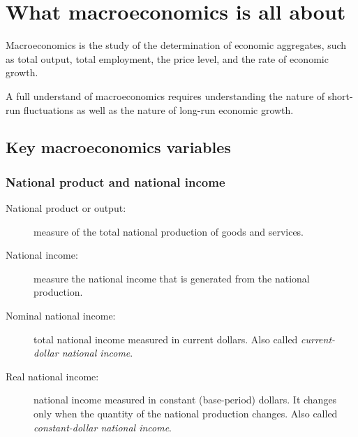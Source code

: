 \documentclass[10pt, twocolumn]{article}
\begin{document}










\section{What macroeconomics is all about}
Macroeconomics is the study of the determination of economic aggregates, such as total output, total employment, the price level, and the rate of economic growth.

A full understand of macroeconomics requires understanding the nature of short-run fluctuations as well as the nature of long-run economic growth.

\subsection{Key macroeconomics variables}
\subsubsection{National product and national income}
\begin{description}
  \item[National product or output:] measure of the total national production of goods and services.
  \item[National income:] measure the national income that is generated from the national production.
  \item[Nominal national income:] total national income measured in current dollars.
        Also called \emph{current-dollar national income}.
  \item[Real national income:] national income measured in constant (base-period) dollars.
        It changes only when the quantity of the national production changes.
        Also called \emph{constant-dollar national income}.
\end{description}
\end{document}
